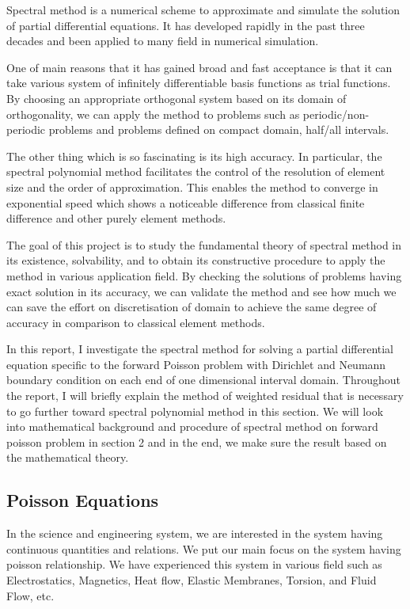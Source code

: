 

Spectral method is a numerical scheme to approximate and simulate the solution of partial differential equations. It has developed rapidly in the past three decades and been applied to many field in numerical simulation.

One of main reasons that it has gained broad and fast acceptance is that it can take various system of infinitely differentiable basis functions as trial functions. By choosing an appropriate orthogonal system based on its domain of orthogonality, we can apply the method to problems such as periodic/non-periodic problems and problems defined on compact domain, half/all intervals.

The other thing which is so fascinating is its high accuracy. In particular, the spectral polynomial method facilitates the control of the resolution of element size and the order of approximation. This enables the method to converge in exponential speed which shows a noticeable difference from classical finite difference and other purely element methods.

The goal of this project is to study the fundamental theory of spectral method in its existence, solvability, and to obtain its constructive procedure to apply the method in various application field. By checking the solutions of problems having exact solution in its accuracy, we can validate the method and see how much we can save the effort on discretisation of domain to achieve the same degree of accuracy in comparison to classical element methods.

In this report, I investigate the spectral method for solving a partial differential equation specific to the forward Poisson problem with Dirichlet and Neumann boundary condition on each end of one dimensional interval domain. Throughout the report, I will briefly explain the method of weighted residual that is necessary to go further toward spectral polynomial method in this section. We will look into mathematical background and procedure of spectral method on forward poisson problem in section 2 and in the end, we make sure the result based on the mathematical theory.


\subsection{Poisson Equations}

In the science and engineering system, we are interested in the system having continuous quantities and relations. We put our main focus on the system having poisson relationship. We have experienced this system in various field such as Electrostatics, Magnetics, Heat flow, Elastic Membranes, Torsion, and Fluid Flow, etc.

